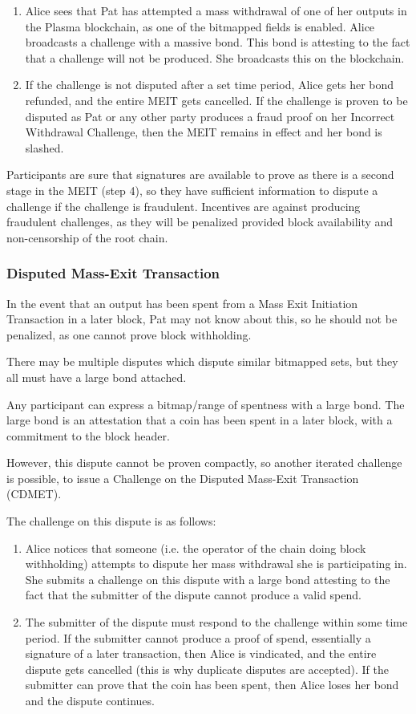 \documentclass[letterpaper, 11pt]{article}
\begin{document}
\begin{enumerate}
	\item
		Alice sees that Pat has attempted a mass withdrawal of one of
		her outputs in the Plasma blockchain, as one of the bitmapped
		fields is enabled. Alice broadcasts a challenge with a massive
		bond. This bond is attesting to the fact that a challenge will
		not be produced. She broadcasts this on the blockchain.
	\item
		If the challenge is not disputed after a set time period, Alice
		gets her bond refunded, and the entire MEIT gets cancelled. If
		the challenge is proven to be disputed as Pat or any other party
		produces a fraud proof on her Incorrect Withdrawal Challenge,
		then the MEIT remains in effect and her bond is slashed.
\end{enumerate}

Participants are sure that signatures are available to prove as there is a
second stage in the MEIT (step 4), so they have sufficient information to
dispute a challenge if the challenge is fraudulent. Incentives are against
producing fraudulent challenges, as they will be penalized provided block
availability and non-censorship of the root chain.

\subsubsection{Disputed Mass-Exit Transaction}

In the event that an output has been spent from a Mass Exit Initiation
Transaction in a later block, Pat may not know about this, so he should not be
penalized, as one cannot prove block withholding.

There may be multiple disputes which dispute similar bitmapped sets, but they
all must have a large bond attached.

Any participant can express a bitmap/range of spentness with a large bond. The
large bond is an attestation that a coin has been spent in a later block, with a
commitment to the block header.

However, this dispute cannot be proven compactly, so another iterated challenge
is possible, to issue a Challenge on the Disputed Mass-Exit Transaction (CDMET).

The challenge on this dispute is as follows:
\begin{enumerate}
	\item
		Alice notices that someone (i.e. the operator of the chain doing
		block withholding) attempts to dispute her mass withdrawal she
		is participating in. She submits a challenge on this dispute
		with a large bond attesting to the fact that the submitter of
		the dispute cannot produce a valid spend.
	\item
		The submitter of the dispute must respond to the challenge
		within some time period. If the submitter cannot produce a proof
		of spend, essentially a signature of a later transaction, then
		Alice is vindicated, and the entire dispute gets cancelled (this
		is why duplicate disputes are accepted). If the submitter can
		prove that the coin has been spent, then Alice loses her bond
		and the dispute continues.
\end{enumerate}
\end{document}
